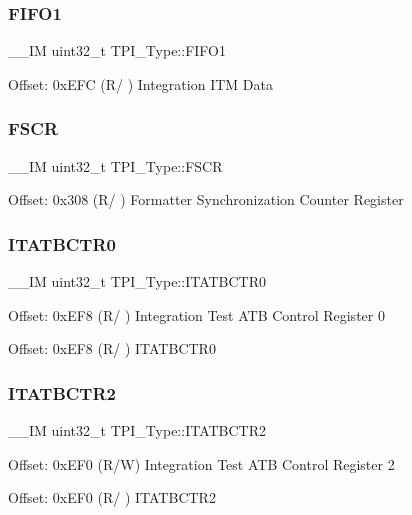 \subsubsection{\texorpdfstring{FIFO1}{FIFO1}}
{\footnotesize\ttfamily \+\_\+\+\_\+\+IM uint32\+\_\+t T\+P\+I\+\_\+\+Type\+::\+F\+I\+F\+O1}

Offset\+: 0x\+E\+FC (R/ ) Integration I\+TM Data \mbox{\label{struct_t_p_i___type_ad6901bfd8a0089ca7e8a20475cf494a8}} 
\subsubsection{\texorpdfstring{FSCR}{FSCR}}
{\footnotesize\ttfamily \+\_\+\+\_\+\+IM uint32\+\_\+t T\+P\+I\+\_\+\+Type\+::\+F\+S\+CR}

Offset\+: 0x308 (R/ ) Formatter Synchronization Counter Register \mbox{\label{struct_t_p_i___type_aaa573b2e073e76e93c51ecec79c616d0}} 
\subsubsection{\texorpdfstring{ITATBCTR0}{ITATBCTR0}}
{\footnotesize\ttfamily \+\_\+\+\_\+\+IM uint32\+\_\+t T\+P\+I\+\_\+\+Type\+::\+I\+T\+A\+T\+B\+C\+T\+R0}

Offset\+: 0x\+E\+F8 (R/ ) Integration Test A\+TB Control Register 0

Offset\+: 0x\+E\+F8 (R/ ) I\+T\+A\+T\+B\+C\+T\+R0 \mbox{\label{struct_t_p_i___type_ab358319b969d3fed0f89bbe33e9f1652}} 
\subsubsection{\texorpdfstring{ITATBCTR2}{ITATBCTR2}\hspace{0.1cm}{\footnotesize\ttfamily [1/2]}}
{\footnotesize\ttfamily \+\_\+\+\_\+\+IM uint32\+\_\+t T\+P\+I\+\_\+\+Type\+::\+I\+T\+A\+T\+B\+C\+T\+R2}

Offset\+: 0x\+E\+F0 (R/W) Integration Test A\+TB Control Register 2

Offset\+: 0x\+E\+F0 (R/ ) I\+T\+A\+T\+B\+C\+T\+R2 \mbox{\label{struct_t_p_i___type_ab358319b969d3fed0f89bbe33e9f1652}} 
